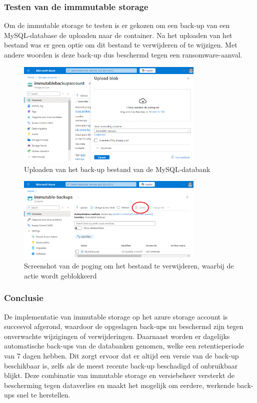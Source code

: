 \subsubsection{Testen van de immmutable storage}
Om de immutable storage te testen is er gekozen om een back-up van een MySQL-database de uploaden naar de container. Na het uploaden van het bestand was er geen optie om dit bestand te verwijderen of te wijzigen. Met andere woorden is deze back-up dus beschermd tegen een ransomware-aanval.
\begin{figure}[h]
    \centering
    \captionsetup{justification=centering}    
    \includegraphics[width=0.8\textwidth]{img/7imm.png}
    \caption{Uploaden van het back-up bestand van de MySQL-databank}
\end{figure}
\begin{figure}[h]
    \centering
    \captionsetup{justification=centering}    
    \includegraphics[width=0.8\textwidth]{img/8imm.png}
    \caption{Screenshot van de poging om het bestand te verwijderen, waarbij de actie wordt geblokkeerd}
\end{figure}
\subsubsection{Conclusie}
De implementatie van immutable storage op het azure storage account is succesvol afgerond, waardoor de opgeslagen back-ups nu beschermd zijn tegen onverwachte wijzigingen of verwijderingen. Daarnaast worden er dagelijks automatische back-ups van de databanken genomen, welke een retentieperiode van 7 dagen hebben. Dit zorgt ervoor dat er altijd een versie van de back-up beschikbaar is, zelfs als de meest recente back-up beschadigd of onbruikbaar blijkt. Deze combinatie van immutable storage en versiebeheer versterkt de bescherming tegen dataverlies en maakt het mogelijk om eerdere, werkende back-ups snel te herstellen.


